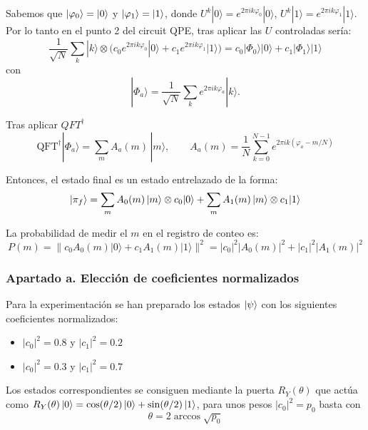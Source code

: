Sabemos que $\ket{\varphi_0} = \ket{0}$ y $\ket{\varphi_1} = \ket{1}$, 
donde $U^k|0\rangle=e^{2\pi i k\varphi_0}|0\rangle$, $U^k|1\rangle=e^{2\pi i k\varphi_1}|1\rangle$. 
Por lo tanto en el punto 2 del circuit QPE, tras aplicar las $U$ controladas sería:
\begin{equation}
\frac{1}{\sqrt N}\sum_k|k\rangle\otimes\Big(c_0e^{2\pi i k\varphi_0}|0\rangle+c_1e^{2\pi i k\varphi_1}|1\rangle\Big)=c_0|\Phi_0\rangle|0\rangle+c_1|\Phi_1\rangle|1\rangle
\end{equation}
con 
\[|\Phi_a\rangle=\frac{1}{\sqrt N}\sum_k e^{2\pi i k\varphi_a}|k\rangle .\]

Tras aplicar $QFT^{\dagger}$
\begin{equation}
\text{QFT}^\dagger|\Phi_a\rangle=\sum_m A_a(m)\,|m\rangle,\qquad A_a(m)=\frac1N\sum_{k=0}^{N-1}e^{2\pi i k(\varphi_a-m/N)}
\end{equation}

Entonces, el estado final es un estado entrelazado de la forma:
\begin{equation}
\ket{\pi_f} = \sum_m A_0(m)\,|m\rangle\otimes c_0|0\rangle+\sum_m A_1(m)\,|m\rangle\otimes c_1|1\rangle
\end{equation}

La probabilidad de medir el $m$ en el registro de conteo es:
\begin{equation}
\label{eq:prob_m}
P(m)=\big\|c_0A_0(m)|0\rangle+c_1A_1(m)|1\rangle\big\|^2=|c_0|^2|A_0(m)|^2+|c_1|^2|A_1(m)|^2
\end{equation}



\subsubsection{Apartado a. Elección de coeficientes normalizados}

Para la experimentación se han preparado los estados $\ket{\psi}$ con los siguientes coeficientes normalizados:
\begin{itemize}
    \item $|c_0|^2 = 0.8$ y $|c_1|^2 = 0.2$
    \item  $|c_0|^2 = 0.3$ y $|c_1|^2 = 0.7$
\end{itemize}

Los estados correspondientes se consiguen mediante la puerta $R_Y(\theta)$ que actúa como
$R_Y(\theta)\ket{0} = \cos(\theta/2)\ket{0} + \sin(\theta/2)\ket{1}$, para unos pesos $|c_0|^2 = p_0$ basta con
\[\theta = 2\arccos\sqrt{p_0}\]

